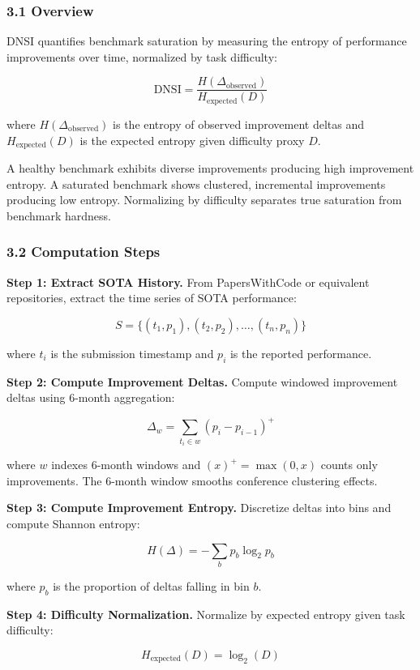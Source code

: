 
\subsubsection{3.1 Overview}

DNSI quantifies benchmark saturation by measuring the entropy of performance improvements over time, normalized by task difficulty:

$$\text{DNSI} = \frac{H(\Delta_{\text{observed}})}{H_{\text{expected}}(D)}$$

where $H(\Delta_{\text{observed}})$ is the entropy of observed improvement deltas and $H_{\text{expected}}(D)$ is the expected entropy given difficulty proxy $D$.

A healthy benchmark exhibits diverse improvements producing high improvement entropy. A saturated benchmark shows clustered, incremental improvements producing low entropy. Normalizing by difficulty separates true saturation from benchmark hardness.

\subsubsection{3.2 Computation Steps}

\textbf{Step 1: Extract SOTA History.} From PapersWithCode or equivalent repositories, extract the time series of SOTA performance:

$$S = \{(t_1, p_1), (t_2, p_2), \ldots, (t_n, p_n)\}$$

where $t_i$ is the submission timestamp and $p_i$ is the reported performance.

\textbf{Step 2: Compute Improvement Deltas.} Compute windowed improvement deltas using 6-month aggregation:

$$\Delta_w = \sum_{t_i \in w} (p_i - p_{i-1})^+$$

where $w$ indexes 6-month windows and $(x)^+ = \max(0, x)$ counts only improvements. The 6-month window smooths conference clustering effects.

\textbf{Step 3: Compute Improvement Entropy.} Discretize deltas into bins and compute Shannon entropy:

$$H(\Delta) = -\sum_{b} p_b \log_2 p_b$$

where $p_b$ is the proportion of deltas falling in bin $b$.

\textbf{Step 4: Difficulty Normalization.} Normalize by expected entropy given task difficulty:

$$H_{\text{expected}}(D) = \log_2(D)$$

